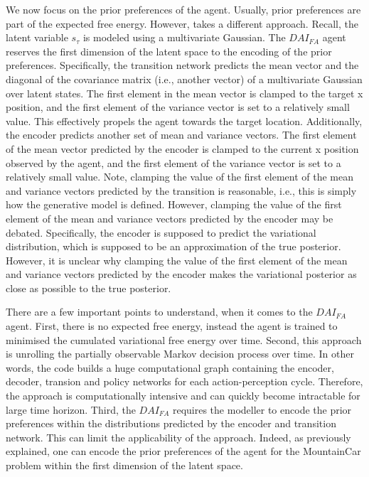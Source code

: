 \documentclass[twoside,11pt]{article}
\begin{document}
We now focus on the prior preferences of the agent. Usually, prior preferences are part of the expected free energy. However, \citet{DAI_Kai} takes a different approach. Recall, the latent variable $s_\tau$ is modeled using a multivariate Gaussian. The $DAI_{FA}$ agent reserves the first dimension of the latent space to the encoding of the prior preferences. Specifically, the transition network predicts the mean vector and the diagonal of the covariance matrix (i.e., another vector) of a multivariate Gaussian over latent states. The first element in the mean vector is clamped to the target x position, and the first element of the variance vector is set to a relatively small value. This effectively propels the agent towards the target location. Additionally, the encoder predicts another set of mean and variance vectors. The first element of the mean vector predicted by the encoder is clamped to the current x position observed by the agent, and the first element of the variance vector is set to a relatively small value. Note, clamping the value of the first element of the mean and variance vectors predicted by the transition is reasonable, i.e., this is simply how the generative model is defined. However, clamping the value of the first element of the mean and variance vectors predicted by the encoder may be debated. Specifically, the encoder is supposed to predict the variational distribution, which is supposed to be an approximation of the true posterior. However, it is unclear why clamping the value of the first element of the mean and variance vectors predicted by the encoder makes the variational posterior as close as possible to the true posterior.

There are a few important points to understand, when it comes to the $DAI_{FA}$ agent. First, there is no expected free energy, instead the agent is trained to minimised the cumulated variational free energy over time. Second, this approach is unrolling the partially observable Markov decision process over time. In other words, the code builds a huge computational graph containing the encoder, decoder, transion and policy networks for each action-perception cycle. Therefore, the approach is computationally intensive and can quickly become intractable for large time horizon. Third, the $DAI_{FA}$ requires the modeller to encode the prior preferences within the distributions predicted by the encoder and transition network. This can limit the applicability of the approach. Indeed, as previously explained, one can encode the prior preferences of the agent for the MountainCar problem within the first dimension of the latent space. 
\end{document}
